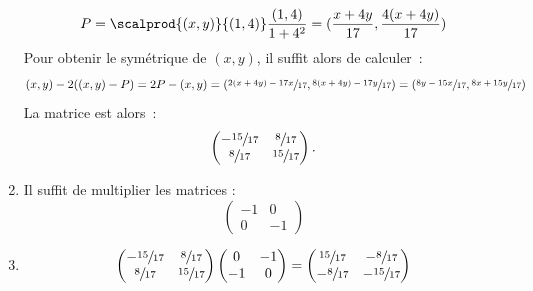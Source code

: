 \documentclass[12pt,french,oneside,a4paper]{memoir} %
\begin{document}
\begin{exo}
\begin{correction}
\begin{enumerate}
    \begin{equation*}
      P =  \scalprod{(x,y)}{(1,4)} \frac{(1,4)}{1+4^{2}} = (\frac{x + 4y}{17}, \frac{4(x+4y)}{17})
    \end{equation*}
    Pour obtenir le symétrique de $(x,y)$, il suffit alors de calculer~:
    \begin{equation*}
      (x,y) - 2 ((x,y) - P) 
      = 2 P - (x,y)
      = (\sfrac{2(x + 4y)-17x}{17}, \sfrac{8(x+4y)-17y}{17}) 
      = (\sfrac{8y-15x}{17}, \sfrac{8x+15y}{17})
    \end{equation*}
    La matrice est alors~:
    \begin{equation*}
      \begin{pmatrix}
        -\sfrac{15}{17} & \sfrac{8}{17}\\
        \sfrac{8}{17}   & \sfrac{15}{17}
      \end{pmatrix}.
    \end{equation*}
  \item Il suffit de multiplier les matrices :
    \begin{equation*}
      \begin{pmatrix}
        -1 & 0\\ 0 &-1
      \end{pmatrix}
    \end{equation*}
  \item 
    \begin{equation*}
      \begin{pmatrix}
        -\sfrac{15}{17} & \sfrac{8}{17}\\
        \sfrac{8}{17} & \sfrac{15}{17}
      \end{pmatrix}\begin{pmatrix}
        0 & -1\\ -1 & 0
      \end{pmatrix} = \begin{pmatrix}
        \sfrac{15}{17} & -\sfrac{8}{17}\\
        -\sfrac{8}{17} & -\sfrac{15}{17}
      \end{pmatrix}
    \end{equation*}
  \end{enumerate}
\end{correction}
\end{exo}
\end{document}
